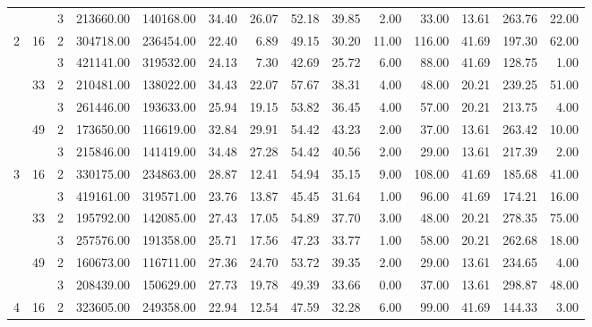 \begin{tabular}{lllrrrrrrrrrrr}
  &    & 3 & 213660.00 & 140168.00 & 34.40 &   26.07 &   52.18 &   39.85 &    2.00 &   33.00 &   13.61 & 263.76 &    22.00 \\
\cline{1-14}
\cline{2-14}
\multirow{6}{*}{2} & \multirow{2}{*}{16} & 2 & 304718.00 & 236454.00 & 22.40 &    6.89 &   49.15 &   30.20 &   11.00 &  116.00 &   41.69 & 197.30 &    62.00 \\
  &    & 3 & 421141.00 & 319532.00 & 24.13 &    7.30 &   42.69 &   25.72 &    6.00 &   88.00 &   41.69 & 128.75 &     1.00 \\
\cline{2-14}
  & \multirow{2}{*}{33} & 2 & 210481.00 & 138022.00 & 34.43 &   22.07 &   57.67 &   38.31 &    4.00 &   48.00 &   20.21 & 239.25 &    51.00 \\
  &    & 3 & 261446.00 & 193633.00 & 25.94 &   19.15 &   53.82 &   36.45 &    4.00 &   57.00 &   20.21 & 213.75 &     4.00 \\
\cline{2-14}
  & \multirow{2}{*}{49} & 2 & 173650.00 & 116619.00 & 32.84 &   29.91 &   54.42 &   43.23 &    2.00 &   37.00 &   13.61 & 263.42 &    10.00 \\
  &    & 3 & 215846.00 & 141419.00 & 34.48 &   27.28 &   54.42 &   40.56 &    2.00 &   29.00 &   13.61 & 217.39 &     2.00 \\
\cline{1-14}
\cline{2-14}
\multirow{6}{*}{3} & \multirow{2}{*}{16} & 2 & 330175.00 & 234863.00 & 28.87 &   12.41 &   54.94 &   35.15 &    9.00 &  108.00 &   41.69 & 185.68 &    41.00 \\
  &    & 3 & 419161.00 & 319571.00 & 23.76 &   13.87 &   45.45 &   31.64 &    1.00 &   96.00 &   41.69 & 174.21 &    16.00 \\
\cline{2-14}
  & \multirow{2}{*}{33} & 2 & 195792.00 & 142085.00 & 27.43 &   17.05 &   54.89 &   37.70 &    3.00 &   48.00 &   20.21 & 278.35 &    75.00 \\
  &    & 3 & 257576.00 & 191358.00 & 25.71 &   17.56 &   47.23 &   33.77 &    1.00 &   58.00 &   20.21 & 262.68 &    18.00 \\
\cline{2-14}
  & \multirow{2}{*}{49} & 2 & 160673.00 & 116711.00 & 27.36 &   24.70 &   53.72 &   39.35 &    2.00 &   29.00 &   13.61 & 234.65 &     4.00 \\
  &    & 3 & 208439.00 & 150629.00 & 27.73 &   19.78 &   49.39 &   33.66 &    0.00 &   37.00 &   13.61 & 298.87 &    48.00 \\
\cline{1-14}
\cline{2-14}
\multirow{6}{*}{4} & \multirow{2}{*}{16} & 2 & 323605.00 & 249358.00 & 22.94 &   12.54 &   47.59 &   32.28 &    6.00 &   99.00 &   41.69 & 144.33 &     3.00 \\

\end{tabular}
